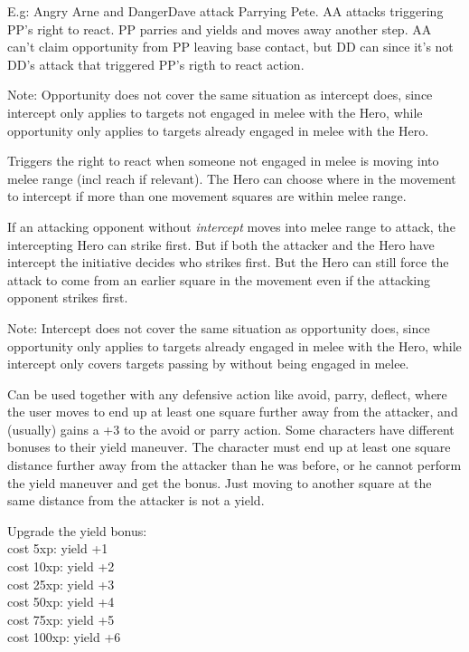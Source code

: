 E.g: Angry Arne and DangerDave attack Parrying Pete. AA attacks triggering PP's right to react. PP parries and yields and moves away another step. AA can't claim opportunity from PP leaving base contact, but DD can since it's not DD's attack that triggered PP's rigth to react action.

Note: Opportunity does not cover the same situation as intercept does, since intercept only applies to targets not engaged in melee with the Hero, while opportunity only applies to targets already engaged in melee with the Hero.


Triggers the right to react when someone not engaged in melee is moving into melee range (incl reach if relevant). The Hero can choose where in the movement to intercept if more than one movement squares are within melee range.

If an attacking opponent without \emph{intercept} moves into melee range to attack, the intercepting Hero can strike first. But if both the attacker and the Hero have intercept the initiative decides who strikes first. But the Hero can still force the attack to come from an earlier square in the movement even if the attacking opponent strikes first.

Note: Intercept does not cover the same situation as opportunity does, since opportunity only applies to targets already engaged in melee with the Hero, while intercept only covers targets passing by without being engaged in melee.


Can be used together with any defensive action like avoid, parry, deflect, where the user moves to end up at least one square further away from the attacker, and (usually) gains a +3 to the avoid or parry action. Some characters have different bonuses to their yield maneuver. The character must end up at least one square distance further away from the attacker than he was before, or he cannot perform the yield maneuver and get the bonus. Just moving to another square at the same distance from the attacker is not a yield.

Upgrade the yield bonus: \\
cost   5xp: yield +1 \\
cost  10xp: yield +2 \\
cost  25xp: yield +3 \\
cost  50xp: yield +4 \\
cost  75xp: yield +5 \\
cost 100xp: yield +6

